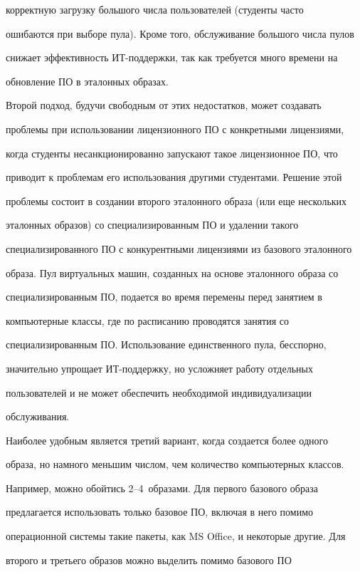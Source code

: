 корректную загрузку большого числа пользователей (студенты часто 

ошибаются при выборе пула). Кроме того, обслуживание большого числа пулов 

снижает эффективность ИТ-под\-держ\-ки, так как требуется много времени на 

обновление ПО в эталонных образах. 

  

  Второй подход, будучи свободным от этих недостатков, может создавать 

проб\-ле\-мы при использовании лицензионного ПО с конкретными лицензиями, 

когда студенты несанкционированно запускают такое лицензионное ПО, что 

приводит к проблемам его использования другими студентами. Решение этой 

проблемы состоит в создании второго эталонного образа (или еще нескольких 

эталонных образов) со специализированным ПО и удалении такого 

специализированного ПО с конкурентными лицензиями из базового эталонного 

образа. Пул виртуальных машин, созданных на основе эталонного образа со 

специализированным ПО, подается во время перемены перед занятием в 

компьютерные классы, где по расписанию проводятся занятия со 

специализированным ПО. Использование единственного пула, бесспорно, 

значительно упрощает ИТ-под\-держ\-ку, но усложняет работу отдельных 

пользователей и не может обеспечить необходимой индивидуализации 

обслуживания. 

  

  Наиболее удобным является третий вариант, когда создается более одного 

образа, но намного меньшим числом, чем количество компьютерных классов. 

Например, можно обойтись 2--4~образами. Для первого базового образа 

предлагается использовать только базовое ПО, включая в него помимо 

операционной сис\-те\-мы такие пакеты, как MS Office, и некоторые другие. Для 

второго и третьего образов можно выделить помимо базового ПО 

